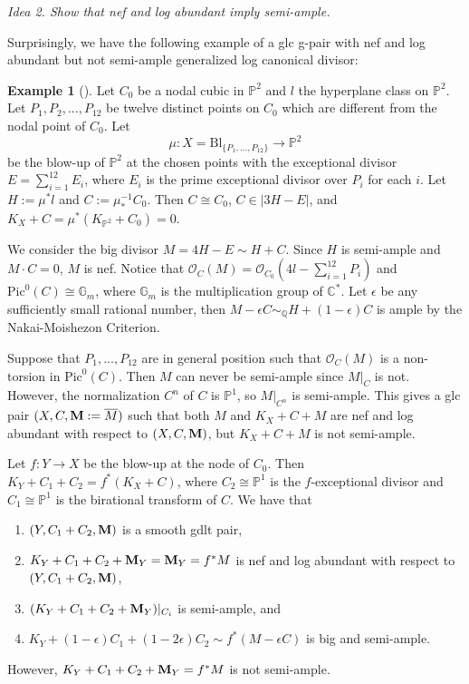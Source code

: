 \documentclass[11pt]{amsart}
\numberwithin{equation}{section}
\newcommand{\Mm}{{\bf{M}}}
\newcommand{\Cc}{\mathbb{C}}
\newcommand{\Pp}{\mathbb{P}}
\newcommand{\Qq}{\mathbb{Q}}
\newcommand{\Oo}{\mathcal{O}}
\newcommand{\Pic}{\mathrm{Pic}}
\theoremstyle{definition}
\theoremstyle{definition}
\newtheorem{ex}[thm]{Example}
\theoremstyle{definition}
\begin{document}
\smallskip

\noindent\textit{Idea 2. Show that nef and log abundant imply semi-ample.}

\smallskip

Surprisingly, we have the following example of a glc g-pair with nef and log abundant but not semi-ample generalized log canonical divisor:



\begin{ex}[{\cite[Example 1.4]{LX22}}]\label{ex: log abundant not semi-ample}
Let $C_0$ be a nodal cubic in $\Pp^2$ and $l$ the hyperplane class on $\Pp^2$. Let $P_1,P_2,...,P_{12}$ be twelve distinct points on $C_0$ which are different from the nodal point of $C_0$. Let
$$
\mu:X=\text{Bl}_{\{P_1,...,P_{12}\}}\to\Pp^2
$$
be the blow-up of $\Pp^2$ at the chosen points with the exceptional divisor $E=\sum_{i=1}^{12}E_i$, where $E_i$ is the prime exceptional divisor over $P_i$ for each $i$. Let $H:=\mu^*l$ and $C:=\mu^{-1}_*C_0$. Then $C\cong C_0$, $C\in|3H-E|$, and $K_X+C=\mu^*(K_{\Pp^2}+C_0)=0$. 

We consider the big divisor $M=4H-E\sim H+C$. Since $H$ is semi-ample and $M\cdot C=0$, $M$ is nef. Notice that $\Oo_C(M)=\Oo_{C_0}(4l-\sum_{i=1}^{12}P_i)$ and $\Pic^0(C)\cong\mathbb G_m$, where $\mathbb G_m$ is the multiplication group of $\Cc^*$. Let $\epsilon$ be any sufficiently small rational number, then $M-\epsilon C\sim_{\Qq}H+(1-\epsilon)C$ is ample by the Nakai-Moishezon Criterion. 

Suppose that $P_1,...,P_{12}$ are in general position such that $\Oo_C(M)$ is a non-torsion in $\Pic^0(C)$. Then $M$ can never be semi-ample since $M|_C$ is not. However, the normalization $C^n$ of $C$ is $\Pp^1$, so $M|_{C^n}$ is semi-ample. This gives a glc pair $(X,C,\Mm:=\overline{M})$ such that both $M$ and $K_X+C+M$ are nef and log abundant with respect to $(X,C,\Mm)$, but $K_X+C+M$ is not semi-ample. 

Let $f: Y\to X$ be the blow-up at the node of $C_0$. Then $K_Y+C_1+C_2=f^*(K_X+C)$, where $C_2\cong \Pp^1$ is the $f$-exceptional divisor and $C_1\cong \Pp^1$ is the birational transform of $C$. We have that
\begin{enumerate}
    \item $(Y,C_1+C_2,\Mm)$ is a smooth gdlt pair,
    \item $K_Y+C_1+C_2+\Mm_Y=\Mm_Y=f^*M$ is nef and log abundant with respect to $(Y,C_1+C_2,\Mm)$,
    \item $(K_Y+C_1+C_2+\Mm_Y)|_{C_i}$ is semi-ample, and
    \item $K_Y+(1-\epsilon)C_1+(1-2\epsilon)C_2\sim f^*(M-\epsilon C)$ is big and semi-ample.
\end{enumerate}
  However, $K_Y+C_1+C_2+\Mm_Y=f^*M$ is not semi-ample.
\end{ex}
\end{document}
